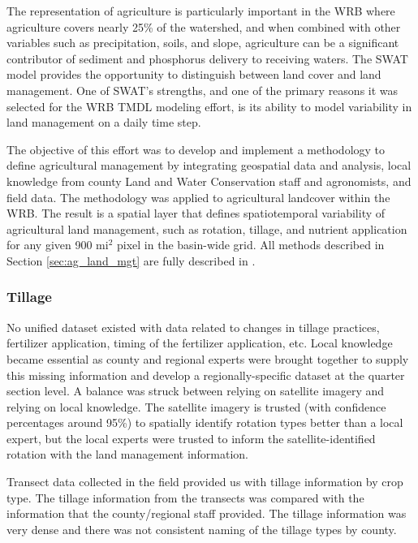 The representation of agriculture is particularly important in the WRB where agriculture covers nearly
25\% of the watershed, and when combined with other variables such as precipitation, soils,
and slope, agriculture can be a significant contributor of sediment and phosphorus delivery to receiving waters.  The SWAT model provides the opportunity to distinguish between land cover and land management.  One of SWAT’s strengths, and one of the primary reasons it was selected for the WRB TMDL modeling effort, is its ability to model variability in land management on a daily time step.

The objective of this effort was to develop and implement a methodology to define agricultural management by integrating geospatial data and analysis, local knowledge from county Land and Water Conservation staff and agronomists, and field data. The methodology was applied to agricultural landcover within the WRB. The result is a spatial layer that defines spatiotemporal variability of agricultural land management, such as rotation, tillage, and nutrient application for any given 900 mi$^2$ pixel in the basin-wide grid. All methods described in Section \ref{sec:ag_land_mgt} are fully described in .

\subsubsection{Tillage}

No unified dataset existed with data related to changes in tillage practices, fertilizer application, timing of the fertilizer application, etc.  Local knowledge became essential as county and regional experts were brought together to supply this missing information and develop a regionally-specific dataset at the quarter section level. A balance was struck between relying on satellite imagery and relying on local knowledge. The satellite imagery is trusted (with confidence percentages around 95\%) to spatially identify rotation types better than a local expert, but the local experts were trusted to inform the satellite-identified rotation with the land management information.  

Transect data collected in the field provided us with tillage information by crop type. The tillage information from the transects was compared with the information that the county/regional staff provided. The tillage information was very dense and there was not consistent naming of the tillage types by county.

